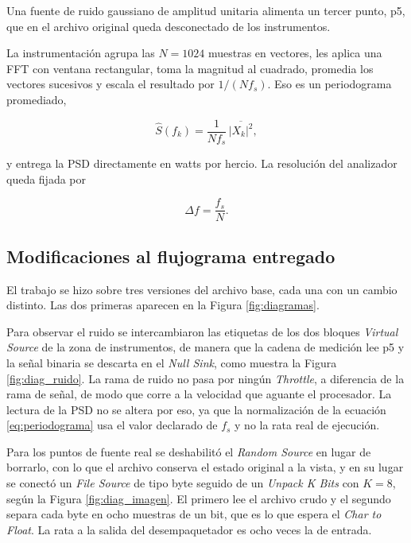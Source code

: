\documentclass[twocolumn]{IEEEtran}
\begin{document}
Una fuente de ruido gaussiano de amplitud unitaria alimenta un tercer punto, p5, que en el archivo original queda desconectado de los instrumentos.

La instrumentación agrupa las $N = 1024$ muestras en vectores, les aplica una FFT con ventana rectangular, toma la magnitud al cuadrado, promedia los vectores sucesivos y escala el resultado por $1/(N f_s)$. Eso es un periodograma promediado,

\begin{equation}
    \hat{S}(f_k) = \frac{1}{N f_s}\,\overline{|X_k|^2},
    \label{eq:periodograma}
\end{equation}

y entrega la PSD directamente en watts por hercio. La resolución del analizador queda fijada por

\begin{equation}
    \Delta f = \frac{f_s}{N}.
    \label{eq:resolucion}
\end{equation}

\subsection{Modificaciones al flujograma entregado}

El trabajo se hizo sobre tres versiones del archivo base, cada una con un cambio distinto. Las dos primeras aparecen en la Figura \ref{fig:diagramas}.

Para observar el ruido se intercambiaron las etiquetas de los dos bloques \textit{Virtual Source} de la zona de instrumentos, de manera que la cadena de medición lee p5 y la señal binaria se descarta en el \textit{Null Sink}, como muestra la Figura \ref{fig:diag_ruido}. La rama de ruido no pasa por ningún \textit{Throttle}, a diferencia de la rama de señal, de modo que corre a la velocidad que aguante el procesador. La lectura de la PSD no se altera por eso, ya que la normalización de la ecuación \eqref{eq:periodograma} usa el valor declarado de $f_s$ y no la rata real de ejecución.

Para los puntos de fuente real se deshabilitó el \textit{Random Source} en lugar de borrarlo, con lo que el archivo conserva el estado original a la vista, y en su lugar se conectó un \textit{File Source} de tipo byte seguido de un \textit{Unpack K Bits} con $K = 8$, según la Figura \ref{fig:diag_imagen}. El primero lee el archivo crudo y el segundo separa cada byte en ocho muestras de un bit, que es lo que espera el \textit{Char to Float}. La rata a la salida del desempaquetador es ocho veces la de entrada.
\end{document}
